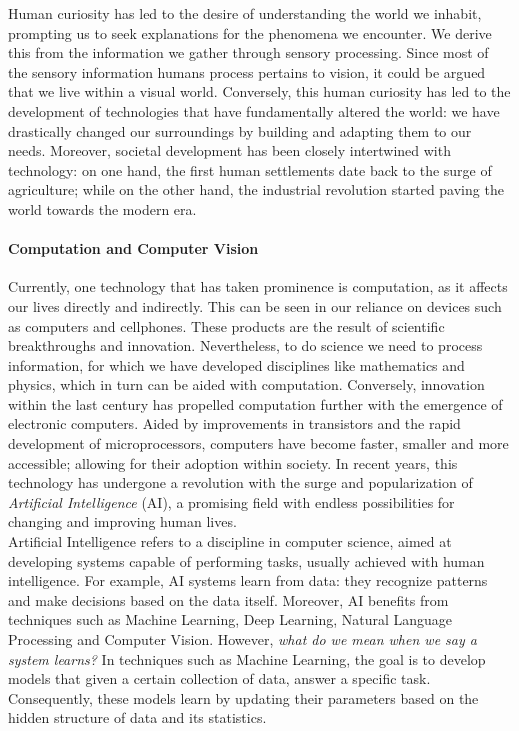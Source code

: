 Human curiosity has led to the desire of understanding the world we inhabit, prompting us to seek
explanations for the phenomena we encounter. We derive this from the information we gather through 
sensory processing. Since most of the sensory information humans process pertains 
to vision, it could be argued that we live within a visual world. Conversely, this human curiosity 
has led to the development of technologies that have fundamentally altered the world: we have 
drastically changed our surroundings by building and adapting them to our needs. Moreover, societal 
development has been closely intertwined with technology: on one hand, the first human settlements 
date back to the surge of agriculture; while on the other hand, the industrial revolution started 
paving the world towards the modern era.\\

\paragraph{Computation and Computer Vision} Currently, one technology that has taken prominence is 
computation, as it affects our lives directly and indirectly. This can be seen in our reliance on 
devices such as computers and  cellphones. These products are the result of scientific breakthroughs 
and innovation. Nevertheless, to do science we need to process information, for which we have 
developed disciplines like mathematics and physics, which in turn can be aided with computation. 
Conversely, innovation within the last century has propelled computation further with the emergence 
of electronic computers. Aided by improvements in transistors and the rapid development of 
microprocessors, computers have become faster, smaller and more accessible; allowing for their 
adoption within society. In recent years, this technology has undergone a revolution with the surge 
and popularization of \emph{Artificial Intelligence} (AI), a promising field with endless 
possibilities for changing and improving human lives.\\

\noindent Artificial Intelligence refers to a discipline in computer science, aimed at developing 
systems capable of performing tasks, usually achieved with human intelligence. For example, AI 
systems learn from data: they recognize patterns and make decisions based on the data itself. 
Moreover, AI benefits from techniques such as Machine Learning, Deep Learning, Natural Language 
Processing and Computer Vision. However, \emph{what do we mean when we say a system learns?} In 
techniques such as Machine Learning, the goal is to develop models that given a certain collection 
of data, answer a specific task. Consequently, these models learn by updating their parameters 
based on the hidden structure of data and its statistics.\\

